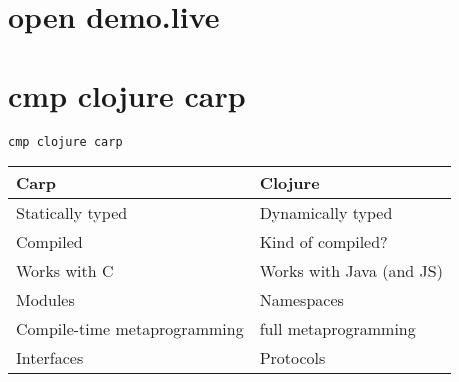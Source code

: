 \documentclass{beamer}
\begin{document}
  \section{open demo.live}
  \section{cmp clojure carp}
  \begin{frame}{\texttt{cmp clojure carp}}
    \begin{tabular}{ l | l }
      Carp & Clojure \\
      \hline
      \hline
      Statically typed & Dynamically typed \\ \hline
      Compiled & Kind of compiled? \\ \hline
      Works with C & Works with Java (and JS) \\ \hline
      \hline
      Modules & Namespaces \\ \hline
      Compile-time metaprogramming & full metaprogramming \\ \hline
      Interfaces & Protocols \\
    \end{tabular}
  \end{frame}
\end{document}
